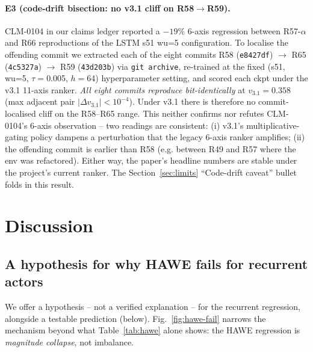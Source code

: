 \documentclass[journal,onecolumn,11pt]{IEEEtran}
\begin{document}
\paragraph{E3 (code-drift bisection: no v3.1 cliff on R58$\rightarrow$R59).}
CLM-0104 in our claims ledger reported a $-19\%$ 6-axis regression
between R57-$\alpha$ and R66 reproductions of the LSTM s51 wu=5
configuration. To localise the offending commit we extracted each
of the eight commits R58 (\texttt{e8427df}) $\rightarrow$ R65
(\texttt{4c5327a}) $\rightarrow$ R59 (\texttt{43d203b}) via
\texttt{git archive}, re-trained at the fixed
(s51, wu=5, $\tau=$0.005, $h=$64) hyperparameter setting, and
scored each ckpt under the v3.1 11-axis ranker.
\emph{All eight commits reproduce bit-identically} at
$v_{3.1}=0.358$ (max adjacent pair $|\Delta v_{3.1}| < 10^{-4}$).
Under v3.1 there is therefore no commit-localised cliff on the
R58--R65 range. This neither confirms nor refutes CLM-0104's
6-axis observation -- two readings are consistent: (i) v3.1's
multiplicative-gating policy dampens a perturbation that the
legacy 6-axis ranker amplifies; (ii) the offending commit is
earlier than R58 (e.g. between R49 and R57 where the env was
refactored). Either way, the paper's headline numbers are stable
under the project's current ranker. The Section~\ref{sec:limits}
``Code-drift caveat'' bullet folds in this result.

\section{Discussion}\label{sec:discussion}

\subsection{A hypothesis for why HAWE fails for recurrent actors}\label{sec:hidden-state}

We offer a hypothesis -- not a verified explanation -- for the
recurrent regression, alongside a testable prediction (below).
Fig.~\ref{fig:hawe-fail} narrows the mechanism beyond what
Table~\ref{tab:hawe} alone shows: the HAWE regression is
\emph{magnitude collapse}, not imbalance.
\end{document}
